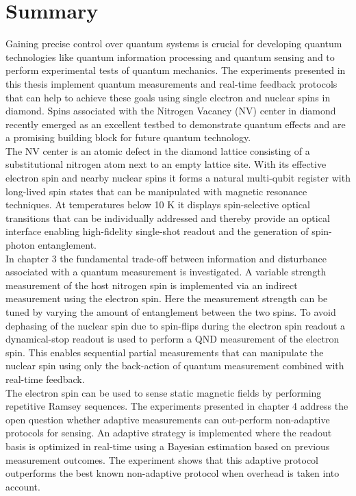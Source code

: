 \chapter{Summary}

Gaining precise control over quantum systems is crucial for developing quantum technologies like quantum information processing and quantum sensing and to perform experimental tests of quantum mechanics. The experiments presented in this thesis implement quantum measurements and real-time feedback protocols that can help to achieve these goals using single electron and nuclear spins in diamond. Spins associated with the Nitrogen Vacancy (NV) center in diamond recently emerged as an excellent testbed to demonstrate quantum effects and are a promising building block for future quantum technology.\\

The NV center is an atomic defect in the diamond lattice consisting of a substitutional nitrogen atom next to an empty lattice site. With its effective electron spin and nearby nuclear spins it forms a natural multi-qubit register with long-lived spin states that can be manipulated with magnetic resonance techniques. At temperatures below 10 K it displays spin-selective optical transitions that can be individually addressed and thereby provide an optical interface enabling high-fidelity single-shot readout and the generation of spin-photon entanglement.\\

In chapter 3 the fundamental trade-off between information and disturbance associated with a quantum measurement is investigated. A variable strength measurement of the host nitrogen spin is implemented via an indirect measurement using the electron spin. Here the measurement strength can be tuned by varying the amount of entanglement between the two spins. To avoid dephasing of the nuclear spin due to spin-flips during the electron spin readout a dynamical-stop readout is used to perform a QND measurement of the electron spin. This enables sequential partial measurements that can manipulate the nuclear spin using only the back-action of quantum measurement combined with real-time feedback. \\

The electron spin can be used to sense static magnetic fields by performing repetitive Ramsey sequences. The experiments presented in chapter 4 address the open question whether adaptive measurements can out-perform non-adaptive protocols for sensing. An adaptive strategy is implemented where the readout basis is optimized in real-time using a Bayesian estimation based on previous measurement outcomes. The experiment shows that this adaptive protocol outperforms the best known non-adaptive protocol when overhead is taken into account.\\

